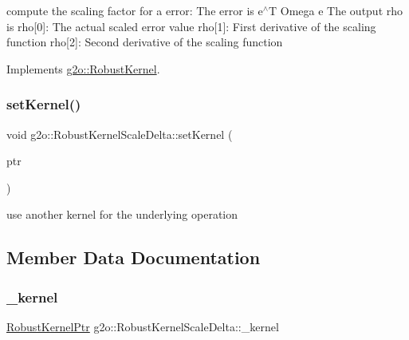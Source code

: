 compute the scaling factor for a error\+: The error is e$^\wedge$T Omega e The output rho is rho\mbox{[}0\mbox{]}\+: The actual scaled error value rho\mbox{[}1\mbox{]}\+: First derivative of the scaling function rho\mbox{[}2\mbox{]}\+: Second derivative of the scaling function 

Implements \mbox{\hyperlink{classg2o_1_1_robust_kernel_ab47b071a0cfe466be063f0104bc41d0f}{g2o\+::\+Robust\+Kernel}}.

\mbox{\label{classg2o_1_1_robust_kernel_scale_delta_a3bcc51d0cf3127e8c0431d1cddc1c75b}} 
\subsubsection{\texorpdfstring{set\+Kernel()}{setKernel()}}
{\footnotesize\ttfamily void g2o\+::\+Robust\+Kernel\+Scale\+Delta\+::set\+Kernel (\begin{DoxyParamCaption}\item[{const \mbox{\hyperlink{namespaceg2o_a0802a5e01a6b1861ae01013220dec6ac}{Robust\+Kernel\+Ptr}} \&}]{ptr }\end{DoxyParamCaption})}



use another kernel for the underlying operation 



\subsection{Member Data Documentation}
\mbox{\label{classg2o_1_1_robust_kernel_scale_delta_a4a2976cb5f12553f0e00dfdf239b1231}} 
\subsubsection{\texorpdfstring{\+\_\+kernel}{\_kernel}}
{\footnotesize\ttfamily \mbox{\hyperlink{namespaceg2o_a0802a5e01a6b1861ae01013220dec6ac}{Robust\+Kernel\+Ptr}} g2o\+::\+Robust\+Kernel\+Scale\+Delta\+::\+\_\+kernel\hspace{0.3cm}{\ttfamily [protected]}}



